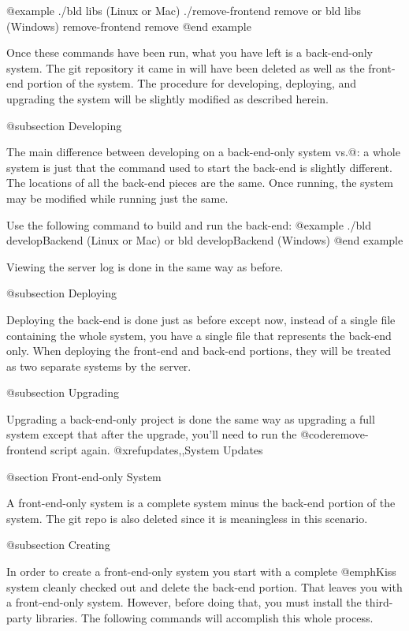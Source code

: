 @example
./bld libs                   (Linux or Mac)
./remove-frontend remove
    or
bld libs                     (Windows)
remove-frontend remove
@end example

Once these commands have been run, what you have left is a back-end-only system.  The git 
repository it came in will have been deleted as well as the front-end portion of the system.
The procedure for developing, deploying, and upgrading the system will be slightly modified as 
described herein.


@subsection Developing

The main difference between developing on a back-end-only system vs.@: a 
whole system is just that the command used to start the back-end is
slightly different.  The locations of all the back-end pieces are
the same.  Once running, the system may be modified while running just
the same.

Use the following command to build and run the back-end:
@example
./bld developBackend         (Linux or Mac)
     or
bld developBackend           (Windows)
@end example

Viewing the server log is done in the same way as before.


@subsection Deploying

Deploying the back-end is done just as before except now, instead of a single file containing the whole system, 
you have a single file that represents the back-end only.  When deploying the front-end and back-end portions,
they will be treated as two separate systems by the server.

@subsection Upgrading

Upgrading a back-end-only project is done the same way as upgrading a full system except that after the upgrade, you'll need to run the 
@code{remove-frontend} script again. @xref{updates,,System Updates}

@section Front-end-only System

A front-end-only system is a complete system minus the back-end portion of the system.
The git repo is also deleted since it is meaningless in this scenario.

@subsection Creating

In order to create a front-end-only system you start with a complete
@emph{Kiss} system cleanly checked out and delete the back-end
portion.  That leaves you with a front-end-only system.  However, before
doing that, you must install the third-party libraries.  The following
commands will accomplish this whole process.

